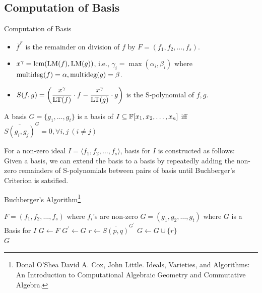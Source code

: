 \documentclass[aspectratio=169, handout, 10pt, hyperref=colorlinks]{beamer}
\begin{document}
\subsection{Computation of \Grob Basis}
\begin{frame}[allowframebreaks]{Computation of \Grob Basis}
    \begin{defn}
    \begin{itemize}
        \item $\overline{f}^F$ is the remainder on division of $f$ by $F=(f_1,f_2,\ldots,f_s)$.
        \item $x^\gamma=\operatorname{lcm}(\operatorname{LM}(f),\operatorname{LM}(g))$, i.e.,  $\gamma_i=\max(\alpha_i,\beta_i)$ where $\operatorname{multideg}(f)=\alpha, \operatorname{multideg}(g)=\beta$.
        \item $S(f,g)=\left(\dfrac{x^\gamma}{\operatorname{LT}(f)}\cdot f-\dfrac{x^\gamma}{\operatorname{LT}(g)}\cdot g\right)$ is the S-polynomial of $f,g$.
    \end{itemize}
\end{defn}
\begin{theorem}{\label{eq:buchbergercriterion}}
    A basis $G = \{g_1, \ldots, g_t\}$ is a \Grob basis of $I\subseteq\mathbb{F}[x_1, x_2, \ldots, x_n]$ iff $\overline{S(g_i,g_j)}^G=0, \forall i,j\ (i\neq j)$
\end{theorem}
\begin{theorem}{\label{algo:buchberger}}
    For a non-zero ideal $I=\langle f_1,f_2,\ldots,f_s\rangle$, \Grob basis for $I$ is constructed as follows:\\
    Given a basis, we can extend the basis to a \Grob basis by repeatedly adding the non-zero remainders of S-polynomials between pairs of basis until Buchberger's Criterion is satsified.
\end{theorem}
\begin{center}
    \begin{algorithm}[H]
    \caption{Buchberger's Algorithm\footnote{\tiny Donal O’Shea David A. Cox, John Little.
Ideals, Varieties, and Algorithms: An Introduction to Computational Algebraic Geometry and
Commutative Algebra.}}\label{alg:polynomialdivisionsingle}
    \begin{algorithmic}
    \Require $F=(f_1,f_2,\ldots,f_s)$ where $f_i$'s are non-zero
    \Ensure $G=(g_1, g_2, \ldots, g_t)$ where $G$ is a \Grob Basis for $I$
    \State $G \gets F$
    \Repeat
    \State $G^\prime \gets G$
    \State $r\gets \overline{S(p,q)}^{G^\prime}$
    \State $G\gets G\cup\{r\}$
    \EndIf
    \EndFor
    \\
    \Return $G$
    \end{algorithmic}
    \end{algorithm}
\end{center}
\end{frame}
\end{document}
